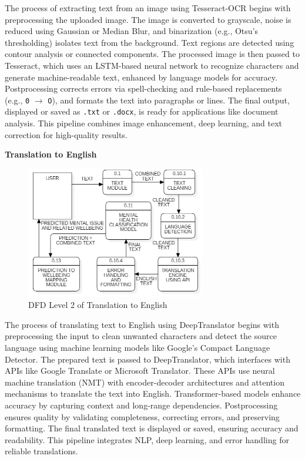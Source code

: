 \noindent
The process of extracting text from an image using Tesseract-OCR begins with preprocessing the uploaded image. The image is converted to grayscale, noise is reduced using Gaussian or Median Blur, and binarization (e.g., Otsu’s thresholding) isolates text from the background. Text regions are detected using contour analysis or connected components. The processed image is then passed to Tesseract, which uses an LSTM-based neural network to recognize characters and generate machine-readable text, enhanced by language models for accuracy. Postprocessing corrects errors via spell-checking and rule-based replacements (e.g., \texttt{0} $\rightarrow$ \texttt{O}), and formats the text into paragraphs or lines. The final output, displayed or saved as \texttt{.txt} or \texttt{.docx}, is ready for applications like document analysis. This pipeline combines image enhancement, deep learning, and text correction for high-quality results.

\vspace{2em}

\noindent
\textbf{Translation to English}

\begin{figure}[h!]  
    \centering
    \includegraphics[width=0.7\textwidth]{Images/DFD L2 TE.png}  
    \caption{DFD Level 2 of Translation to English}
    \label{dfdl111}  %
\end{figure}

\noindent
The process of translating text to English using DeepTranslator begins with preprocessing the input to clean unwanted characters and detect the source language using machine learning models like Google’s Compact Language Detector. The prepared text is passed to DeepTranslator, which interfaces with APIs like Google Translate or Microsoft Translator. These APIs use neural machine translation (NMT) with encoder-decoder architectures and attention mechanisms to translate the text into English. Transformer-based models enhance accuracy by capturing context and long-range dependencies. Postprocessing ensures quality by validating completeness, correcting errors, and preserving formatting. The final translated text is displayed or saved, ensuring accuracy and readability. This pipeline integrates NLP, deep learning, and error handling for reliable translations.

